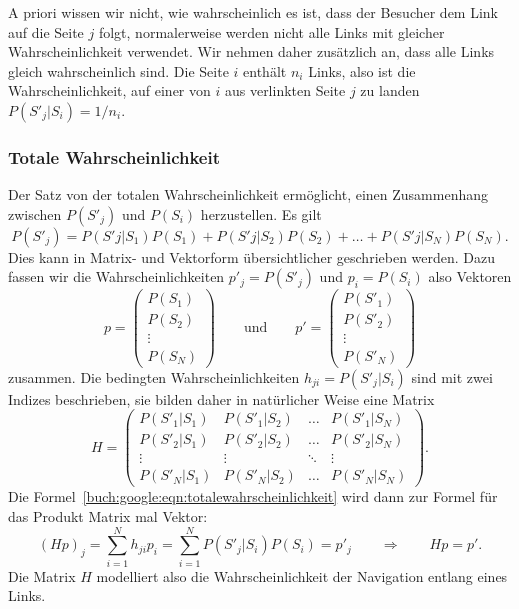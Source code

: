 A priori wissen wir nicht, wie wahrscheinlich es ist, dass der Besucher
dem Link auf die Seite $j$ folgt, normalerweise werden nicht alle
Links mit gleicher Wahrscheinlichkeit verwendet.
Wir nehmen daher zusätzlich an, dass alle Links gleich wahrscheinlich
sind.
Die Seite $i$ enthält $n_i$ Links, also ist die Wahrscheinlichkeit,
auf einer von $i$ aus verlinkten Seite $j$ zu landen $P(S'_j|S_i) = 1/n_i$.

\subsubsection{Totale Wahrscheinlichkeit}
Der Satz von der totalen Wahrscheinlichkeit ermöglicht, einen Zusammenhang
%
%
zwischen $P(S'_j)$ und $P(S_i)$ herzustellen.
Es gilt
\begin{equation}
P(S'_j)
=
P(S'j|S_1) P(S_1)
+
P(S'j|S_2) P(S_2)
+
\dots
+
P(S'j|S_N) P(S_N).
\label{buch:google:eqn:totalewahrscheinlichkeit}
\end{equation}
Dies kann in Matrix- und Vektorform übersichtlicher geschrieben werden.
Dazu fassen wir die Wahrscheinlichkeiten $p'_j=P(S'_j)$ und $p_i=P(S_i)$
also Vektoren
\[
p
=
\begin{pmatrix}
P(S_1)\\
P(S_2)\\
\vdots\\
P(S_N)
\end{pmatrix}
\qquad
\text{und}
\qquad
p'
=
\begin{pmatrix}
P(S'_1)\\
P(S'_2)\\
\vdots\\
P(S'_N)
\end{pmatrix}
\]
zusammen.
Die bedingten Wahrscheinlichkeiten $h_{ji}=P(S'_j|S_i)$ sind mit zwei Indizes
beschrieben, sie bilden daher in natürlicher Weise eine Matrix
\[
H
=
\begin{pmatrix}
P(S'_1|S_1)&P(S'_1|S_2)&\dots &P(S'_1|S_N)\\
P(S'_2|S_1)&P(S'_2|S_2)&\dots &P(S'_2|S_N)\\
\vdots     &\vdots     &\ddots&\vdots     \\
P(S'_N|S_1)&P(S'_N|S_2)&\dots &P(S'_N|S_N)
\end{pmatrix}.
\]
Die Formel~\eqref{buch:google:eqn:totalewahrscheinlichkeit} wird dann zur
Formel für das Produkt Matrix mal Vektor:
\[
(Hp)_j
=
\sum_{i=1}^N h_{ji} p_i
=
\sum_{i=1}^N P(S'_j|S_i) P(S_i)
=
p'_j
\qquad\Rightarrow\qquad
Hp=p'.
\]
Die Matrix $H$ modelliert also die Wahrscheinlichkeit der Navigation
entlang eines Links.

